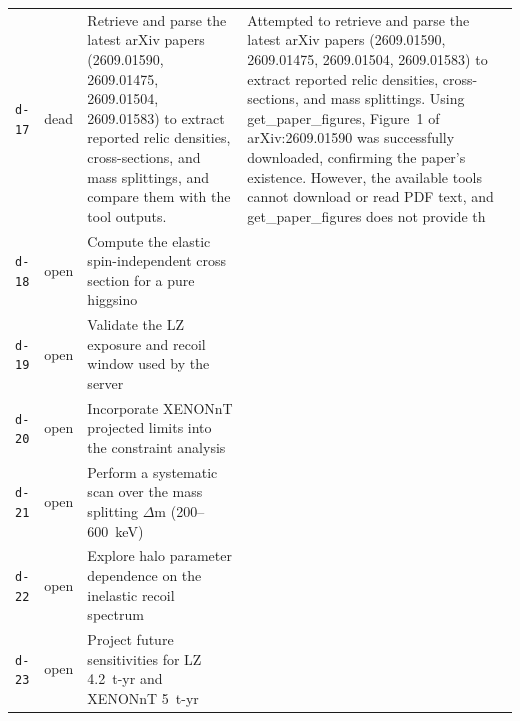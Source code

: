 \documentclass[11pt,a4paper]{article}
\begin{document}
\begin{longtable}{@{}p{}p{}p{}p{}@{}}
\texttt{d-17} & dead & Retrieve and parse the latest arXiv papers (2609.01590, 2609.01475, 2609.01504, 2609.01583) to extract reported relic densities, cross-sections, and mass splittings, and compare them with the tool outputs. & Attempted to retrieve and parse the latest arXiv papers (2609.01590, 2609.01475, 2609.01504, 2609.01583) to extract reported relic densities, cross-sections, and mass splittings. Using get\_paper\_figures, Figure~1 of arXiv:2609.01590 was successfully downloaded, confirming the paper's existence. However, the available tools cannot download or read PDF text, and get\_paper\_figures does not provide th \\
\texttt{d-18} & open & Compute the elastic spin-independent cross section for a pure higgsino &  \\
\texttt{d-19} & open & Validate the LZ exposure and recoil window used by the server &  \\
\texttt{d-20} & open & Incorporate XENONnT projected limits into the constraint analysis &  \\
\texttt{d-21} & open & Perform a systematic scan over the mass splitting $\Delta$m (200--600~keV) &  \\
\texttt{d-22} & open & Explore halo parameter dependence on the inelastic recoil spectrum &  \\
\texttt{d-23} & open & Project future sensitivities for LZ 4.2~t-yr and XENONnT 5~t-yr &  \\
\bottomrule\end{longtable}
\end{document}
